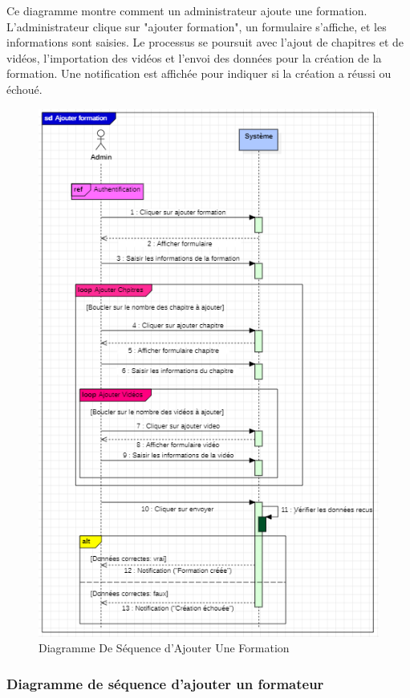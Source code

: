 Ce diagramme montre comment un administrateur ajoute une formation. L'administrateur clique sur "ajouter formation", un formulaire s'affiche, et les informations sont saisies. Le processus se poursuit avec l'ajout de chapitres et de vidéos, l'importation des vidéos et l'envoi des données pour la création de la formation. Une notification est affichée pour indiquer si la création a réussi ou échoué.

\begin{figure}[H]
    \centering
    \includegraphics[width=15cm]{Figures/diagrammeDeSequenceCreerCourse.PNG}
    \caption{Diagramme De Séquence d'Ajouter Une Formation}
\end{figure}

\subsubsection*{Diagramme de séquence d'ajouter un formateur}

